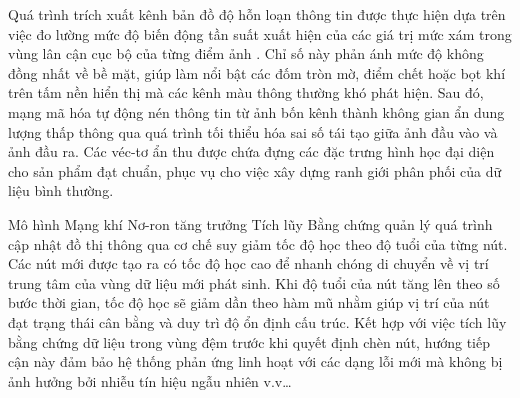 Quá trình trích xuất kênh bản đồ độ hỗn loạn thông tin được thực hiện dựa trên việc đo lường mức độ biến động tần suất xuất hiện của các giá trị mức xám trong vùng lân cận cục bộ của từng điểm ảnh \cite{shannon1948mathematical}. Chỉ số này phản ánh mức độ không đồng nhất về bề mặt, giúp làm nổi bật các đốm tròn mờ, điểm chết hoặc bọt khí trên tấm nền hiển thị mà các kênh màu thông thường khó phát hiện. Sau đó, mạng mã hóa tự động nén thông tin từ ảnh bốn kênh thành không gian ẩn dung lượng thấp thông qua quá trình tối thiểu hóa sai số tái tạo giữa ảnh đầu vào và ảnh đầu ra. Các véc-tơ ẩn thu được chứa đựng các đặc trưng hình học đại diện cho sản phẩm đạt chuẩn, phục vụ cho việc xây dựng ranh giới phân phối của dữ liệu bình thường.

Mô hình Mạng khí Nơ-ron tăng trưởng Tích lũy Bằng chứng quản lý quá trình cập nhật đồ thị thông qua cơ chế suy giảm tốc độ học theo độ tuổi của từng nút. Các nút mới được tạo ra có tốc độ học cao để nhanh chóng di chuyển về vị trí trung tâm của vùng dữ liệu mới phát sinh. Khi độ tuổi của nút tăng lên theo số bước thời gian, tốc độ học sẽ giảm dần theo hàm mũ nhằm giúp vị trí của nút đạt trạng thái cân bằng và duy trì độ ổn định cấu trúc. Kết hợp với việc tích lũy bằng chứng dữ liệu trong vùng đệm trước khi quyết định chèn nút, hướng tiếp cận này đảm bảo hệ thống phản ứng linh hoạt với các dạng lỗi mới mà không bị ảnh hưởng bởi nhiễu tín hiệu ngẫu nhiên v.v…